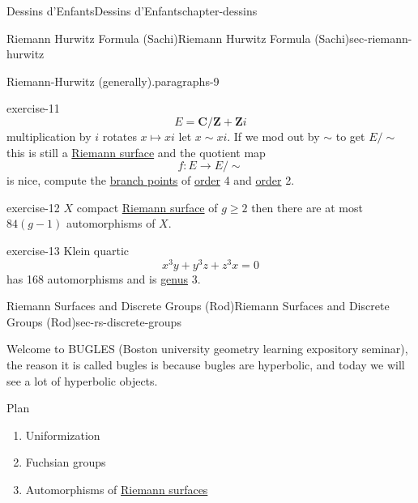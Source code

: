 \documentclass[oneside,10pt,]{book}
\numberwithin{equation}{section}
\newcommand{\ZZ}{\mathbf{Z}}
\newcommand{\CC}{\mathbf{C}}
\begin{document}
\begin{chapterptx}{Dessins d'Enfants}{}{Dessins d'Enfants}{}{}{chapter-dessins}
\begin{sectionptx}{Riemann Hurwitz Formula (Sachi)}{}{Riemann Hurwitz Formula (Sachi)}{}{}{sec-riemann-hurwitz}
\begin{paragraphs}{Riemann-Hurwitz (generally).}{paragraphs-9}
\begin{inlineexercise}{}{exercise-11}
\hypertarget{p-536}{}%
%
\begin{equation*}
E = \CC/ \ZZ + \ZZ i
\end{equation*}
multiplication by \(i\) rotates \(x \mapsto xi\) let \(x \sim xi\). If we mod out by \(\sim\) to get \(E/\sim\) this is still a \hyperref[def-top-riem-surface]{Riemann surface} and the quotient map%
\begin{equation*}
f \colon E \to E / \sim
\end{equation*}
is nice, compute the \hyperref[def-branch-point]{branch points}  of \hyperref[def-order-quaternion]{order} 4 and \hyperref[def-order-quaternion]{order} 2.%
\end{inlineexercise}
\begin{inlineexercise}{}{exercise-12}%
\hypertarget{p-537}{}%
\(X\) compact \hyperref[def-top-riem-surface]{Riemann surface} of \(g\ge 2\) then there are at most \(84(g-1)\) automorphisms of \(X\).%
\end{inlineexercise}
\begin{inlineexercise}{}{exercise-13}%
\hypertarget{p-538}{}%
Klein quartic%
\begin{equation*}
x^3 y + y^3 z + z^3 x = 0
\end{equation*}
has 168 automorphisms and is \hyperref[def-class-set]{genus} 3.%
\end{inlineexercise}
\end{paragraphs}%
\end{sectionptx}
%
%
\typeout{************************************************}
\typeout{************************************************}
%
\begin{sectionptx}{Riemann Surfaces and Discrete Groups (Rod)}{}{Riemann Surfaces and Discrete Groups (Rod)}{}{}{sec-rs-discrete-groups}
\begin{introduction}{}%
\hypertarget{p-539}{}%
Welcome to BUGLES (Boston university geometry learning expository seminar), the reason it is called bugles is because bugles are hyperbolic, and today we will see a lot of hyperbolic objects.%
\par
\hypertarget{p-540}{}%
Plan\leavevmode%
\begin{enumerate}
\item\hypertarget{li-106}{}Uniformization%
\item\hypertarget{li-107}{}Fuchsian groups%
\item\hypertarget{li-108}{}Automorphisms of \hyperref[def-top-riem-surface]{Riemann surfaces}%

\end{enumerate}
\end{introduction}
\end{sectionptx}
\end{chapterptx}
\end{document}
